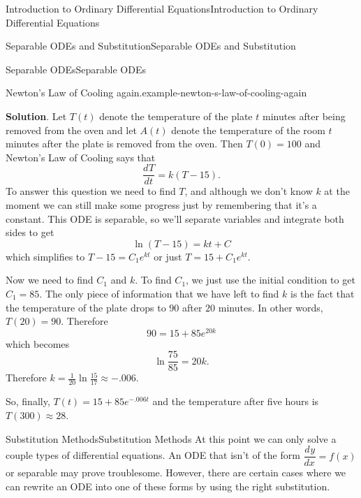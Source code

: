 \documentclass[10pt,]{book}
\numberwithin{equation}{section}
\newcommand{\dv}[3][]{\dfrac{d^{#1} #2}{d #3^{#1}}}
\begin{document}
\begin{chapterptx}{Introduction to Ordinary Differential Equations}{}{Introduction to Ordinary Differential Equations}{}{}
\begin{sectionptx}{Separable ODEs and Substitution}{}{Separable ODEs and Substitution}{}{}
\begin{subsectionptx}{Separable ODEs}{}{Separable ODEs}{}{}
\begin{example}{Newton's Law of Cooling again.}{example-newton-s-law-of-cooling-again}
\par\smallskip%
\noindent\textbf{Solution}.\hypertarget{solution-10}{}\quad%
\hypertarget{p-58}{}%
Let \(T(t)\) denote the temperature of the plate \(t\) minutes after being removed from the oven and let \(A(t)\) denote the temperature of the room \(t\) minutes after the plate is removed from the oven. Then \(T(0) = 100\) and Newton's Law of Cooling says that%
%
\begin{equation*}
\dv{T}{t} = k(T-15).
\end{equation*}
\hypertarget{p-59}{}%
To answer this question we need to find \(T\), and although we don't know \(k\) at the moment we can still make some progress just by remembering that it's a constant. This ODE is separable, so we'll separate variables and integrate both sides to get%
\begin{equation*}
\ln(T-15) = kt+C
\end{equation*}
which simplifies to \(T-15 = C_{1}e^{kt}\) or just \(T = 15+C_{1}e^{kt}\).%
\par
\hypertarget{p-60}{}%
Now we need to find \(C_{1}\) and \(k\). To find \(C_{1}\), we just use the initial condition to get \(C_{1} = 85\). The only piece of information that we have left to find \(k\) is the fact that the temperature of the plate drops to \(90\) after \(20\) minutes. In other words, \(T(20) = 90\). Therefore%
\begin{equation*}
90 = 15+85e^{20k}
\end{equation*}
which becomes%
\begin{equation*}
\ln\frac{75}{85} = 20k\text{.}
\end{equation*}
Therefore \(k = \frac{1}{20}\ln\frac{15}{17}\approx-.006.\)%
\par
\hypertarget{p-61}{}%
So, finally, \(T(t) = 15+85e^{-.006t}\) and the temperature after five hours is \(T(300)\approx28\).%
\end{example}
\end{subsectionptx}
%
%
\typeout{************************************************}
\typeout{************************************************}
%
\begin{subsectionptx}{Substitution Methods}{}{Substitution Methods}{}{}\label{subsection-substitution-methods}
\hypertarget{p-62}{}%
At this point we can only solve a couple types of differential equations. An ODE that isn't of the form \(\dv{y}{x} = f(x)\) or separable may prove troublesome. However, there are certain cases where we can rewrite an ODE into one of these forms by using the right substitution.%

\end{subsectionptx}
\end{sectionptx}
\end{chapterptx}
\end{document}
